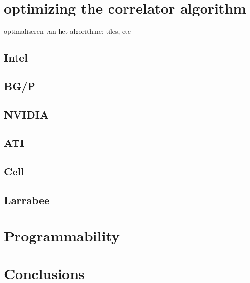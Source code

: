 \documentclass{article}
\begin{document}
\section {optimizing the correlator algorithm}
\- optimaliseren van het algorithme: tiles, etc
\subsection{Intel}
\subsection{BG/P}
\subsection{NVIDIA}
\subsection{ATI}
\subsection{Cell}
\subsection{Larrabee}

 
\section{Programmability}


\section{Conclusions}




\end{document}
